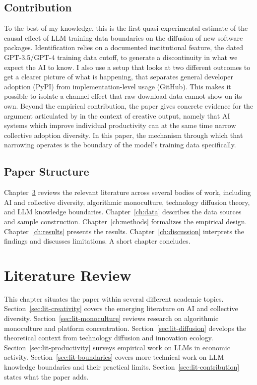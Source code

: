 \documentclass[12pt, a4paper]{report}
\begin{document}
\section{Contribution}\label{sec:intro-contribution}
To the best of my knowledge, this is the first quasi-experimental estimate of the causal effect of LLM training data boundaries on the diffusion of new software packages. Identification relies on a documented institutional feature, the dated GPT-3.5/GPT-4 training data cutoff, to generate a discontinuity in what we expect the AI to know. I also use a setup that looks at two different outcomes to get a clearer picture of what is happening, that separates general developer adoption (PyPI) from implementation-level usage (GitHub). This makes it possible to isolate a channel effect that raw download data cannot show on its own. Beyond the empirical contribution, the paper gives concrete evidence for the argument articulated by \citet{doshi2024generative} in the context of creative output, namely that AI systems which improve individual productivity can at the same time narrow collective adoption diversity. In this paper, the mechanism through which that narrowing operates is the boundary of the model's training data specifically.

\section{Paper Structure}\label{sec:intro-structure}
Chapter~\ref{ch:lit} reviews the relevant literature across several bodies of work, including AI and collective diversity, algorithmic monoculture, technology diffusion theory, and LLM knowledge boundaries. Chapter~\ref{ch:data} describes the data sources and sample construction. Chapter~\ref{ch:methods} formalizes the empirical design. Chapter~\ref{ch:results} presents the results. Chapter~\ref{ch:discussion} interprets the findings and discusses limitations. A short chapter concludes.

\chapter{Literature Review}\label{ch:lit}

This chapter situates the paper within several different academic topics. Section~\ref{sec:lit-creativity} covers the emerging literature on AI and collective diversity. Section~\ref{sec:lit-monoculture} reviews research on algorithmic monoculture and platform concentration. Section~\ref{sec:lit-diffusion} develops the theoretical context from technology diffusion and innovation ecology. Section~\ref{sec:lit-productivity} surveys empirical work on LLMs in economic activity. Section~\ref{sec:lit-boundaries} covers more technical work on LLM knowledge boundaries and their practical limits. Section~\ref{sec:lit-contribution} states what the paper adds.
\end{document}
